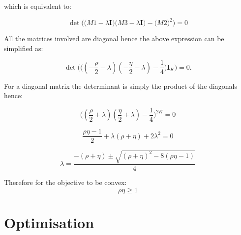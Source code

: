 \documentclass{aamas2016}
\begin{document}
which is equivalent to:

\begin{equation}
	\det \Bigg( \Big(M1 - \lambda\mathbf{I}\Big)\Big(M3 - \lambda\mathbf{I}\Big) - \Big(M2\Big)^2 \Bigg) = 0
\end{equation}

All the matrices involved are diagonal hence the above expression can be simplified as:

\begin{equation}
	\det \Bigg( \big( (-\frac{\rho}{2}-\lambda)(-\frac{\eta}{2}-\lambda) - \frac{1}{4}\big)\mathbf{I}_K \Bigg) = 0.
\end{equation}

For a diagonal matrix the determinant is simply the product of the diagonals hence:

\begin{equation} 
	\big( (\frac{\rho}{2}+\lambda)(\frac{\eta}{2}+\lambda) - \frac{1}{4}\big)^{2K} = 0
\end{equation}

\begin{equation}
	\frac{\rho \eta -1}{2} + \lambda(\rho+\eta) + 2\lambda^2  = 0 
\end{equation}

\begin{equation}
	\lambda = \frac{-(\rho+\eta) \pm \sqrt{(\rho+\eta)^2 - 8(\rho \eta -1)}}{4}
\end{equation}

Therefore for the objective to be convex:
\begin{equation}
	\rho \eta \geq 1
\end{equation}

\section{Optimisation}
\end{document}
